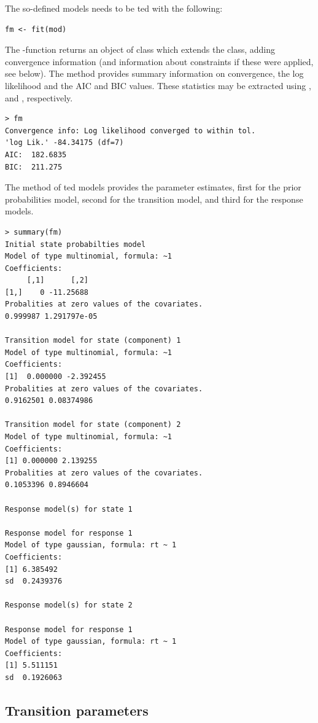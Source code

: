 \documentclass[article]{jss}
\begin{document}
The so-defined models needs to be ted with the following: 
\begin{verbatim}
fm <- fit(mod)
\end{verbatim}

The -function returns an object of class
 which extends the  class, adding
convergence information (and information about constraints if these
were applied, see below).  The  method provides summary
information on convergence, the log likelihood and the AIC and BIC
values.  These statistics may be extracted using ,
 and , respectively.

\begin{verbatim}
> fm 
Convergence info: Log likelihood converged to within tol. 
'log Lik.' -84.34175 (df=7)
AIC:  182.6835 
BIC:  211.275 
\end{verbatim}

The  method of ted models provides the parameter
estimates, first for the prior probabilities model, second for the
transition model, and third for the response models.

\begin{verbatim}
> summary(fm)
Initial state probabilties model 
Model of type multinomial, formula: ~1
Coefficients: 
     [,1]      [,2]
[1,]    0 -11.25688
Probalities at zero values of the covariates.
0.999987 1.291797e-05 

Transition model for state (component) 1 
Model of type multinomial, formula: ~1
Coefficients: 
[1]  0.000000 -2.392455
Probalities at zero values of the covariates.
0.9162501 0.08374986 

Transition model for state (component) 2 
Model of type multinomial, formula: ~1
Coefficients: 
[1] 0.000000 2.139255
Probalities at zero values of the covariates.
0.1053396 0.8946604 

Response model(s) for state 1 

Response model for response 1 
Model of type gaussian, formula: rt ~ 1
Coefficients: 
[1] 6.385492
sd  0.2439376 

Response model(s) for state 2 

Response model for response 1 
Model of type gaussian, formula: rt ~ 1
Coefficients: 
[1] 5.511151
sd  0.1926063 
\end{verbatim}


\subsection{Transition parameters}
\end{document}
